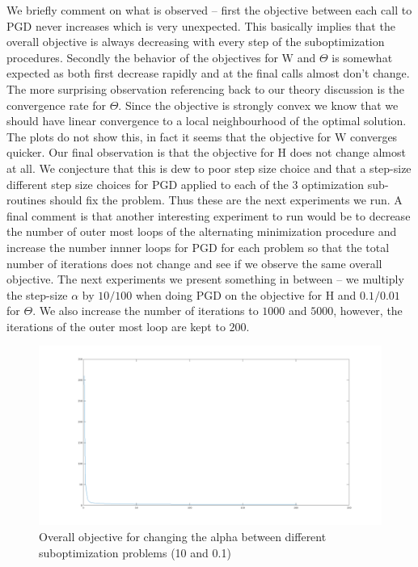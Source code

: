\documentclass{article}
\newcommand{\0}{\mathrm{0}}
\newcommand{\1}{\mathrm{1}}
\renewcommand{\H}{\mathrm{H}}
\newcommand{\W}{\mathrm{W}}
\begin{document}
We briefly comment on what is observed -- first the objective between each call to PGD never increases which is very unexpected. This basically implies that the overall objective is always decreasing with every step of the suboptimization procedures. Secondly the behavior of the objectives for $\W$ and $\Theta$ is somewhat expected as both first decrease rapidly and at the final calls almost don't change. The more surprising observation referencing back to our theory discussion is the convergence rate for $\Theta$. Since the objective is strongly convex we know that we should have linear convergence to a local neighbourhood of the optimal solution. The plots do not show this, in fact it seems that the objective for $\W$ converges quicker. Our final observation is that the objective for $\H$ does not change almost at all. We conjecture that this is dew to poor step size choice and that a step-size different step size choices for PGD applied to each of the 3 optimization sub-routines should fix the problem. Thus these are the next experiments we run. A final comment is that another interesting experiment to run would be to decrease the number of outer most loops of the alternating minimization procedure and increase the number innner loops for PGD for each problem so that the total number of iterations does not change and see if we observe the same overall objective. The next experiments we present something in between -- we multiply the step-size $\alpha$ by $10/100$ when doing PGD on the objective for $\H$ and $0.1/0.01$ for $\Theta$. We also increase the number of iterations to $1000$ and $5000$, however, the iterations of the outer most loop are kept to $200$.
\begin{figure}[H]
    \includegraphics[width=\textwidth]{fixed-step-change-alpha.png}
    \caption{Overall objective for changing the alpha between different suboptimization problems (10 and 0.1)}
\end{figure}
\end{document}
